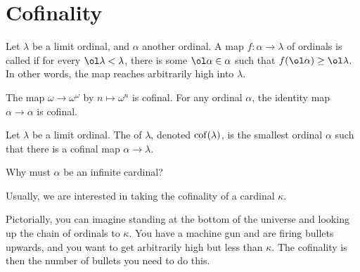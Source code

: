 \section{Cofinality}

\begin{definition}
	Let $\lambda$ be a limit ordinal, and $\alpha$ another ordinal.
	A map $f : \alpha \to \lambda$ of ordinals is called 
	if for every $\ol\lambda < \lambda$, there is some $\ol\alpha \in \alpha$
	such that $f(\ol\alpha) \ge \ol\lambda$.
	In other words, the map reaches arbitrarily high into $\lambda$.
\end{definition}
\begin{example}
	\listhack
	\begin{enumerate}[(a)]
		\ii The map $\omega \to \omega^\omega$ by $n \mapsto \omega^n$ is cofinal.
		\ii For any ordinal $\alpha$, the identity map $\alpha \to \alpha$ is cofinal.
	\end{enumerate}
\end{example}

\begin{definition}
	Let $\lambda$ be a limit ordinal.
	The  of $\lambda$, denoted $\operatorname{cof}(\lambda)$,
	is the smallest ordinal $\alpha$ such that there is a cofinal map
	$\alpha \to \lambda$.
\end{definition}
\begin{ques}
	Why must $\alpha$ be an infinite cardinal?
\end{ques}

Usually, we are interested in taking the cofinality of a cardinal $\kappa$.

Pictorially, you can imagine standing at the bottom of the universe and looking
up the chain of ordinals to $\kappa$.
You have a machine gun and are firing bullets upwards, and you want to get arbitrarily
high but less than $\kappa$.
The cofinality is then the number of bullets you need to do this.

